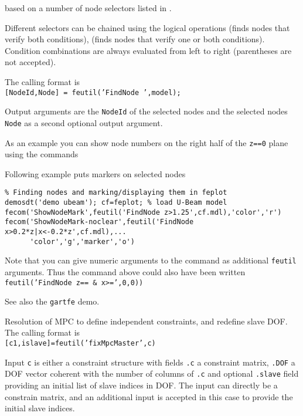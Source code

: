  based on a number of node selectors listed in . 

Different selectors can be chained using the logical operations \ts{\&} (finds nodes that verify both conditions), \ts{|} (finds nodes that verify one or both conditions). Condition combinations are always evaluated from left to right (parentheses are not accepted).

The calling format is\\
{\tt [NodeId,Node] = feutil('FindNode ',model);} 

\noindent Output arguments are the {\tt NodeId} of the selected nodes and the selected nodes {\tt Node} as a second optional output argument. 

\noindent As an example you can show node numbers on the right half of the {\tt z==0} plane using the commands


Following example puts markers on selected nodes
\begin{verbatim}
% Finding nodes and marking/displaying them in feplot
demosdt('demo ubeam'); cf=feplot; % load U-Beam model
fecom('ShowNodeMark',feutil('FindNode z>1.25',cf.mdl),'color','r')
fecom('ShowNodeMark-noclear',feutil('FindNode x>0.2*z|x<-0.2*z',cf.mdl),...
      'color','g','marker','o')
\end{verbatim}%

Note that you can give numeric arguments to the command as additional {\tt feutil} arguments. Thus the command above could also have been written 
{\tt feutil('FindNode z== \& x>=',0,0))}

 See also the {\tt gartfe} demo.



Resolution of MPC to define independent constraints, and redefine slave DOF.
The calling format is\\
{\tt [c1,islave]=feutil('fixMpcMaster',c)}

\noindent Input {\tt c} is either a constraint structure with fields {\tt .c} a constraint matrix, {\tt .DOF} a DOF vector coherent with the number of columns of {\tt .c} and optional {\tt .slave} field providing an initial list of slave indices in DOF. The input can directly be a constrain matrix, and an additional input is accepted in this case to provide the initial slave indices.

